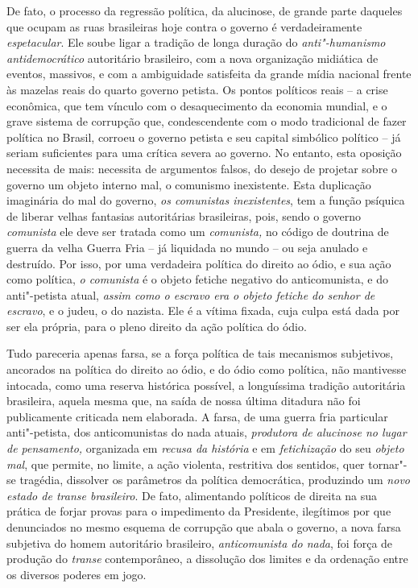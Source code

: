 De fato, o processo da regressão política, da alucinose, de grande parte
daqueles que ocupam as ruas brasileiras hoje contra o governo é
verdadeiramente \emph{espetacular}. Ele soube ligar a tradição de longa
duração do \emph{anti"-humanismo antidemocrático} autoritário brasileiro,
com a nova organização midiática de eventos, massivos, e com a
ambiguidade satisfeita da grande mídia nacional frente às mazelas reais
do quarto governo petista. Os pontos políticos reais -- a crise
econômica, que tem vínculo com o desaquecimento da economia mundial, e o
grave sistema de corrupção que, condescendente com o modo tradicional de
fazer política no Brasil, corroeu o governo petista e seu capital
simbólico político -- já seriam suficientes para uma crítica severa ao
governo. No entanto, esta oposição necessita de mais: necessita de
argumentos falsos, do desejo de projetar sobre o governo um objeto
interno mal, o comunismo inexistente. Esta duplicação imaginária do mal
do governo, \emph{os comunistas inexistentes}, tem a função psíquica de
liberar velhas fantasias autoritárias brasileiras, pois, sendo o governo
\emph{comunista} ele deve ser tratada como um \emph{comunista,} no
código de doutrina de guerra da velha Guerra Fria -- já liquidada no
mundo -- ou seja anulado e destruído. Por isso, por uma verdadeira
política do direito ao ódio, e sua ação como política, \emph{o
comunista} é o objeto fetiche negativo do anticomunista, e do
anti"-petista atual, \emph{assim como o escravo era o objeto fetiche do
senhor de escravo}, e o judeu, o do nazista. Ele é a vítima fixada, cuja
culpa está dada por ser ela própria, para o pleno direito da ação
política do ódio.

Tudo pareceria apenas farsa, se a força política de tais mecanismos
subjetivos, ancorados na política do direito ao ódio, e do ódio como
política, não mantivesse intocada, como uma reserva histórica possível,
a longuíssima tradição autoritária brasileira, aquela mesma que, na
saída de nossa última ditadura não foi publicamente criticada nem
elaborada. A farsa, de uma guerra fria particular anti"-petista, dos
anticomunistas do nada atuais, \emph{produtora de alucinose no lugar de
pensamento,} organizada em \emph{recusa da história} e em
\emph{fetichização} do seu \emph{objeto mal}, que permite, no limite, a
ação violenta, restritiva dos sentidos, quer tornar"-se tragédia,
dissolver os parâmetros da política democrática, produzindo um
\emph{novo estado de transe brasileiro}. De fato, alimentando políticos
de direita na sua prática de forjar provas para o impedimento da
Presidente, ilegítimos por que denunciados no mesmo esquema de corrupção
que abala o governo, a nova farsa subjetiva do homem autoritário
brasileiro, \emph{anticomunista do nada}, foi força de produção do
\emph{transe} contemporâneo, a dissolução dos limites e da ordenação
entre os diversos poderes em jogo.

